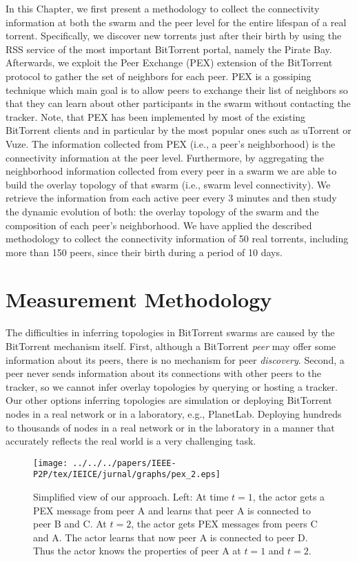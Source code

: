 In this Chapter, we first present a methodology to collect the connectivity information at both the swarm and the peer level for the entire lifespan of a real torrent. Specifically, we discover new torrents just after their birth by using the RSS service of the most important BitTorrent portal, namely the Pirate Bay. 
Afterwards, we exploit the Peer Exchange (PEX) extension of the BitTorrent protocol to gather the set of neighbors for each peer. 
PEX is a gossiping technique which main goal is to allow peers to exchange their list of neighbors so that they can learn about other participants in the swarm without contacting the tracker. 
Note, that PEX has been implemented by most of the existing BitTorrent clients and in particular by the most popular ones such as uTorrent or Vuze. 
The information collected from PEX (i.e., a peer’s neighborhood) is the connectivity information at the peer level. 
Furthermore, by aggregating the neighborhood information collected from every peer in a swarm we are able to build the overlay topology of that swarm (i.e., swarm level connectivity). 
We retrieve the information from each active peer every 3 minutes and then study the dynamic evolution of both: the overlay topology of the swarm and the composition of each peer’s neighborhood.
We have applied the described methodology to collect the connectivity information of 50 real torrents, including more than 150 peers, since their birth during a period of 10 days.

\section{Measurement Methodology}

The difficulties in inferring topologies in BitTorrent swarms are caused by the BitTorrent mechanism itself. 
First, although a BitTorrent \textit{peer} may offer some information about its peers, there is no mechanism for peer \textit{discovery}.  
Second, a peer never sends information about its connections with other peers to the tracker, so we cannot infer overlay topologies by querying or hosting a tracker.  
Our other options inferring topologies are simulation or deploying BitTorrent nodes in a real network or in a laboratory, e.g., PlanetLab. Deploying hundreds to thousands of nodes in a real network or in the laboratory in a manner that accurately reflects the real world is a very challenging task.

\begin{figure}[tb]
\begin{center}
\texttt{[image: ../../../papers/IEEE-P2P/tex/IEICE/jurnal/graphs/pex\_2.eps]}
\end{center}
\caption{Simplified view of our approach. Left: At time $t=1$, the actor gets a PEX message from peer A and
learns that peer A is connected to peer B and C. At $t=2$, the actor gets  PEX messages from peers C and A. The actor
learns that now peer A is connected to peer D. Thus the actor knows the properties of peer A at $t=1$ and $t=2$.} 
\label{fig:pexworks}
\end{figure}

